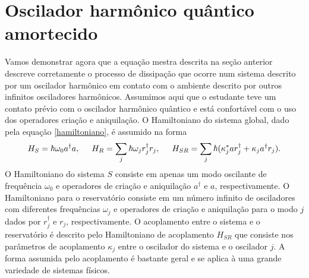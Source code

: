 \documentclass{article}
\begin{document}
\section{Oscilador harmônico quântico amortecido}

Vamos demonstrar agora que a equação mestra descrita na seção anterior descreve corretamente o processo de dissipação que ocorre num sistema descrito por um oscilador harmônico em contato com o ambiente descrito por outros infinitos osciladores harmônicos. Assumimos aqui que o estudante teve um contato prévio com o oscilador harmônico quântico e está confortável com o uso dos operadores criação e aniquilação. O Hamiltoniano do sistema global, dado pela equação \eqref{hamiltoniano}, é assumido na forma
\begin{equation}
    H_S = \hbar\omega_0 a^\dagger a, \hspace{0.5cm} H_R = \sum_j \hbar\omega_j r_j^\dagger r_j, \hspace{0.5cm} H_{SR} = \sum_j \hbar(\kappa_j^* ar_j^\dagger + \kappa_j a^\dagger r_j).
\end{equation}
O Hamiltoniano do sistema $S$ consiste em apenas um modo oscilante de frequência $\omega_0$ e operadores de criação e aniquilação $a^\dagger$ e $a$, respectivamente. O Hamiltoniano para o reservatório consiste em um número infinito de osciladores com diferentes frequências $\omega_j$ e operadores de criação e aniquilação para o modo $j$ dados por $r_j^\dagger$ e $r_j$, respectivamente. O acoplamento entre o sistema e o reservatório é descrito pelo Hamiltoniano de acoplamento $H_{SR}$ que consiste nos parâmetros de acoplamento $\kappa_j$ entre o oscilador do sistema e o oscilador $j$. A forma assumida pelo acoplamento é bastante geral e se aplica à uma grande variedade de sistemas físicos. 
\end{document}

